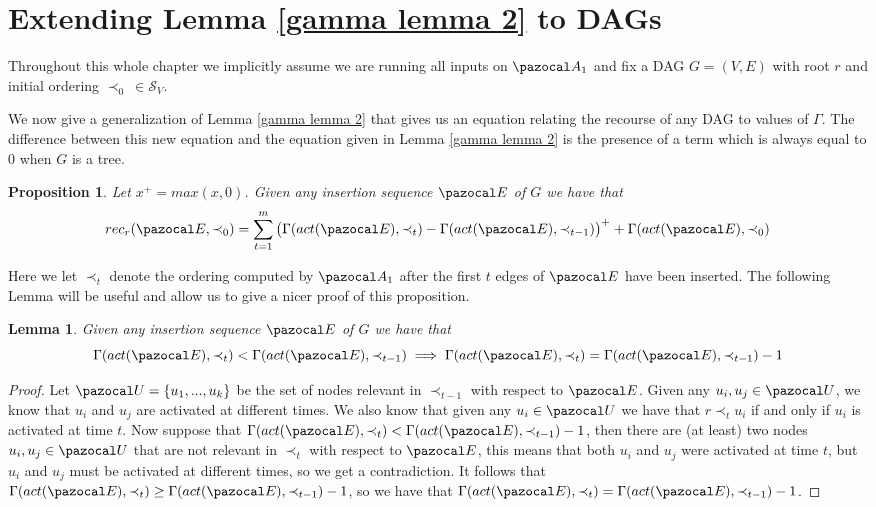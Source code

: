 \documentclass{report}
\newtheorem{lemma}[theorem]{Lemma}
\newtheorem{proposition}[theorem]{Proposition}
\begin{document}
\section{Extending Lemma \ref{gamma lemma 2} to DAGs}

Throughout this whole chapter we implicitly assume we are running all inputs on $\pazocal A_1$ and fix a DAG $G=(V,E)$ with root $r$ and initial ordering $\prec_0 \: \in \mathcal S_V$.

We now give a generalization of Lemma \ref{gamma lemma 2} that gives us an equation relating the recourse of any DAG to values of $\Gamma$. The difference between this new equation and the equation given in Lemma \ref{gamma lemma 2} is the presence of a term which is always equal to 0 when $G$ is a tree.

\begin{proposition}\label{mainobservation} Let $x^+=max(x,0)$. Given any insertion sequence $\pazocal E$ of $G$ we have that
\[ rec_r(\pazocal E, \prec_0) =  \sum_{t=1}^{m}\big(\Gamma(act(\pazocal E), \prec_{t}) - \Gamma(act(\pazocal E), \prec_{t-1})\big)^+ + \Gamma(act(\pazocal E), \prec_0) \]
\end{proposition}

Here we let $\prec_t$ denote the ordering computed by $\pazocal A_1$ after the first $t$ edges of $\pazocal E$ have been inserted. The following Lemma will be useful and allow us to give a nicer proof of this proposition.

\begin{lemma} Given any insertion sequence $\pazocal E$ of $G$ we have that
\[ \Gamma(act(\pazocal E), \prec_{t}) < \Gamma(act(\pazocal E), \prec_{t-1}) \implies \Gamma(act(\pazocal E), \prec_{t}) = \Gamma(act(\pazocal E), \prec_{t-1}) - 1  \]
\end{lemma}

\begin{proof}
Let $\pazocal U = \{u_1,...,u_k\}$ be the set of nodes relevant in $\prec_{t-1}$ with respect to $\pazocal E$. Given any $u_i,u_j \in \pazocal U$, we know that $u_i$ and $u_j$ are activated at different times. We also know that given any $u_i \in \pazocal U$ we have that $r \prec_t u_i$ if and only if $u_i$ is activated at time $t$. Now suppose that $\Gamma(act(\pazocal E), \prec_{t}) < \Gamma(act(\pazocal E), \prec_{t-1}) - 1$, then there are (at least) two nodes $u_i, u_j \in \pazocal U$ that are not relevant in $\prec_t$ with respect to $\pazocal E$, this means that both $u_i$ and $u_j$ were activated at time $t$, but $u_i$ and $u_j$ must be activated at different times, so we get a contradiction. It follows that $\Gamma(act(\pazocal E), \prec_{t}) \geq \Gamma(act(\pazocal E), \prec_{t-1}) - 1$, so we have that $\Gamma(act(\pazocal E), \prec_{t}) = \Gamma(act(\pazocal E), \prec_{t-1}) - 1$.
\end{proof}
\end{document}
